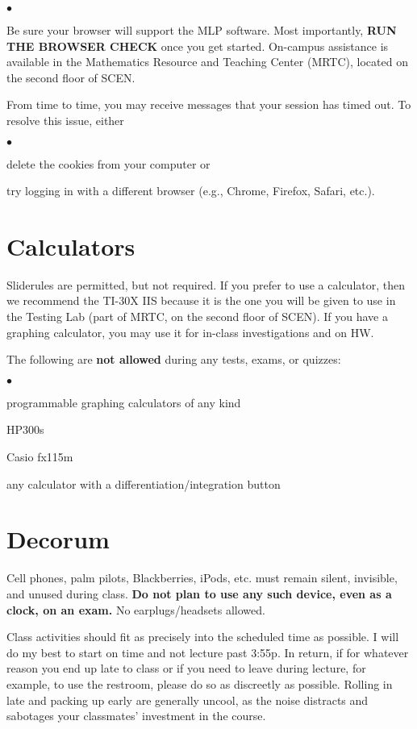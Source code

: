 \documentclass[margin,line,pifont,palatino,courier]{res}
\newenvironment{list1}{
  \begin{list}{\ding{113}}{%
      \setlength{\itemsep}{0in}
      \setlength{\parsep}{0in} \setlength{\parskip}{0in}
      \setlength{\topsep}{0in} \setlength{\partopsep}{0in}
      \setlength{\leftmargin}{0.17in}}}{\end{list}}
\newenvironment{list2}{
  \begin{list}{$\bullet$}{%
      \setlength{\itemsep}{0in}
      \setlength{\parsep}{0in} \setlength{\parskip}{0in}
      \setlength{\topsep}{0in} \setlength{\partopsep}{0in}
      \setlength{\leftmargin}{0.2in}}}{\end{list}}
\begin{document}
\begin{resume}
\begin{list1}
\begin{list2}
	\end{list2}
\item Be sure your browser will support the MLP software.  Most importantly, {\bf RUN THE BROWSER CHECK} once you get started. On-campus assistance is available in the Mathematics Resource and Teaching Center (MRTC), located on the second floor of SCEN.  
\item From time to time, you may receive messages that your session has timed out. To resolve this issue, either 
	\begin{list2}
	\item delete the cookies from your computer or 
	\item try logging in with a different browser (e.g., Chrome, Firefox, Safari, etc.).
	\end{list2}
\end{list1}

\section{\sc Calculators} Sliderules are permitted, but not required.  If you prefer to use a calculator, then we recommend the TI-30X IIS because it is the one you will be given to use in the Testing Lab (part of MRTC, on the second floor of SCEN).  If you have a graphing calculator, you may use it for in-class investigations and on HW.

The following are {\bf not allowed} during any tests, exams, or quizzes:
\begin{list2} 
\item programmable graphing calculators of any kind
\item HP300s 
\item Casio fx115m 
\item any calculator with a differentiation/integration button 
\end{list2}  

\section{\sc Decorum} Cell phones, palm pilots, Blackberries, iPods, etc. must remain silent, invisible, and unused during class.  {\bf Do not plan to use any such device, even as a clock, on an exam.} No earplugs/headsets allowed.

Class activities should fit as precisely into the scheduled time as possible.   I will do my best to start on time and not lecture past 3:55p.  In return, if for whatever reason you end up late to class or if you need to leave during lecture, for example, to use the restroom, please do so as discreetly as possible.  Rolling in late and packing up early are generally uncool, as the noise distracts and sabotages your classmates' investment in the course.  


\end{resume}
\end{document}
